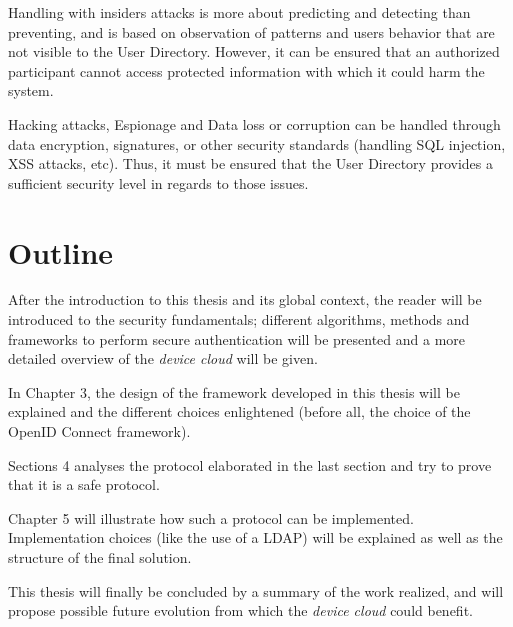 Handling with insiders attacks is more about predicting and detecting than preventing, and is based on observation of patterns and users behavior that are not visible to the User Directory\cite{Schultz2002}. However, it can be ensured that an authorized participant cannot access protected information with which it could harm the system.

Hacking attacks, Espionage and Data loss or corruption can be handled through data encryption, signatures, or other security standards (handling SQL injection, XSS attacks, etc). Thus, it must be ensured that the User Directory provides a sufficient security level in regards to those issues.


\section{Outline}
After the introduction to this thesis and its global context, the reader will be introduced to the security fundamentals; different algorithms, methods and frameworks to perform secure authentication will be presented and a more detailed overview of the \emph{device cloud} will be given.

In Chapter 3, the design of the framework developed in this thesis will be explained and the different choices enlightened (before all, the choice of the OpenID Connect framework).

Sections 4 analyses the protocol elaborated in the last section and try to prove that it is a safe protocol.

Chapter 5 will illustrate how such a protocol can be implemented. Implementation choices (like the use of a LDAP) will be explained as well as the structure of the final solution.

This thesis will finally be concluded by a summary of the work realized, and will propose possible future evolution from which the \emph{device cloud} could benefit.



